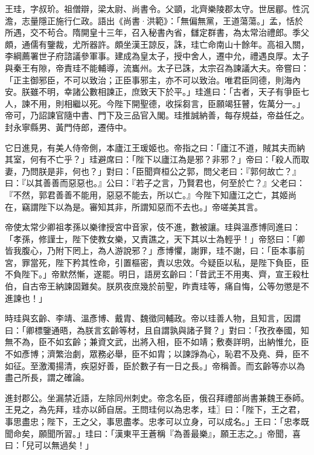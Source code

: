 
\begin{pinyinscope}

 王珪，字叔玠。祖僧辯，梁太尉、尚書令。父顗，北齊樂陵郡太守。世居郿。性沉澹，志量隱正施行仁政。語出《尚書·洪範》：「無偏無黨，王道蕩蕩。」孟，恬於所遇，交不茍合。隋開皇十三年，召入秘書內省，讎定群書，為太常治禮郎。季父頗，通儒有鑒裁，尤所器許。頗坐漢王諒反，誅，珪亡命南山十餘年。高祖入關，李綱薦署世子府諮議參軍事。建成為皇太子，授中舍人，遷中允，禮遇良厚。太子與秦王有隙，帝責珪不能輔導，流巂州。太子已誅，太宗召為諫議大夫。帝嘗曰：「正主御邪臣，不可以致治；正臣事邪主，亦不可以致治。唯君臣同德，則海內安。朕雖不明，幸諸公數相諫正，庶致天下於平。」珪進曰：「古者，天子有爭臣七人，諫不用，則相繼以死。今陛下開聖德，收採芻言，臣願竭狂瞽，佐萬分一。」帝可，乃詔諫官隨中書、門下及三品官入閣。珪推誠納善，每存規益，帝益任之。封永寧縣男、黃門侍郎，遷侍中。



 它日進見，有美人侍帝側，本廬江王瑗姬也。帝指之曰：「廬江不道，賊其夫而納其室，何有不亡乎？」珪避席曰：「陛下以廬江為是邪？非邪？」帝曰：「殺人而取妻，乃問朕是非，何也？」對曰：「臣聞齊桓公之郭，問父老曰：『郭何故亡？』曰：『以其善善而惡惡也。』公曰：『若子之言，乃賢君也，何至於亡？』父老曰：『不然，郭君善善不能用，惡惡不能去，所以亡。』今陛下知廬江之亡，其姬尚在，竊謂陛下以為是。審知其非，所謂知惡而不去也。」帝嗟美其言。



 帝使太常少卿祖孝孫以樂律授宮中音家，伎不進，數被讓。珪與溫彥博同進曰：「孝孫，修謹士，陛下使教女樂，又責譙之，天下其以士為輕乎！」帝怒曰：「卿皆我腹心，乃附下罔上，為人游說邪？」彥博懼，謝罪，珪不謝，曰：「臣本事前宮，罪當死，陛下矜其性命，引置樞密，責以忠效。今疑臣以私，是陛下負臣，臣不負陛下。」帝默然慚，遂罷。明日，語房玄齡曰：「昔武王不用夷、齊，宣王殺杜伯，自古帝王納諫固難矣。朕夙夜庶幾於前聖，昨責珪等，痛自悔，公等勿懲是不進諫也！」



 時珪與玄齡、李靖、溫彥博、戴胄、魏徵同輔政。帝以珪善人物，且知言，因謂曰：「卿標鑒通晤，為朕言玄齡等材，且自謂孰與諸子賢？」對曰：「孜孜奉國，知無不為，臣不如玄齡；兼資文武，出將入相，臣不如靖；敷奏詳明，出納惟允，臣不如彥博；濟繁治劇，眾務必舉，臣不如胄；以諫諍為心，恥君不及堯、舜，臣不如征。至激濁揚清，疾惡好善，臣於數子有一日之長。」帝稱善。而玄齡等亦以為盡己所長，謂之確論。



 進封郡公。坐漏禁近語，左除同州刺史。帝念名臣，俄召拜禮部尚書兼魏王泰師。王見之，為先拜，珪亦以師自居。王問珪何以為忠孝，珪〗曰：「陛下，王之君，事思盡忠；陛下，王之父，事思盡孝。忠孝可以立身，可以成名。」王曰：「忠孝既聞命矣，願聞所習。」珪曰：「漢東平王蒼稱『為善最樂』，願王志之。」帝聞，喜曰：「兒可以無過矣！」




\end{pinyinscope}
